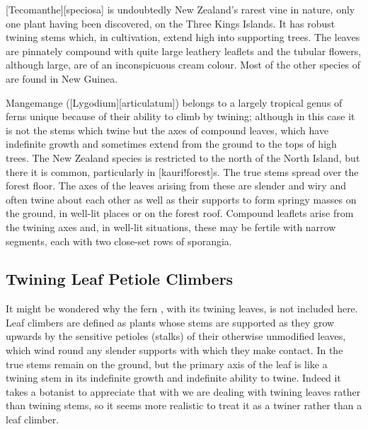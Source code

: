 [Tecomanthe][speciosa] is undoubtedly New Zealand's rarest vine in nature, only one plant having been discovered, on the Three Kings Islands.
It has robust twining stems which, in cultivation, extend high into supporting trees.
The leaves are pinnately compound with quite large leathery leaflets and the tubular flowers, although large, are of an inconspicuous cream colour.
Most of the other species of  are found in New Guinea.

Mangemange ([Lygodium][articulatum]) belongs to a largely tropical genus of ferns unique because of their ability to climb by twining; although in this case it is not the stems which twine but the axes of compound leaves, which have indefinite growth and sometimes extend from the ground to the tops of high trees.
The New Zealand species is restricted to the north of the North Island, but there it is common, particularly in [kauri!forest]s.
The true stems spread over the forest floor.
The axes of the leaves arising from these are slender and wiry and often twine about each other as well as their supports to form springy masses on the ground, in well-lit places or on the forest roof.
Compound leaflets arise from the twining axes and, in well-lit situations, these may be fertile with narrow segments, each with two close-set rows of sporangia.

\subsection{Twining Leaf Petiole Climbers}

It might be wondered why the fern , with its twining leaves, is not included here.
Leaf climbers are defined as plants whose stems are supported as they grow upwards by the sensitive petioles (stalks) of their otherwise unmodified leaves, which wind round any slender supports with which they make contact.
In  the true stems remain on the ground, but the primary axis of the leaf is like a twining stem in its indefinite growth and indefinite ability to twine.
Indeed it takes a botanist to appreciate that with  we are dealing with twining leaves rather than twining stems, so it seems more realistic to treat it as a twiner rather than a leaf climber.

